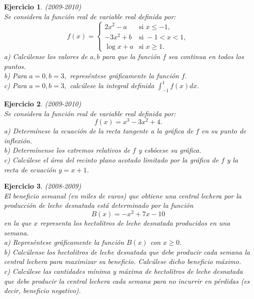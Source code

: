 \documentclass[12pt, a4paper]{amsart}
\newtheorem{ejer}{Ejercicio}
\begin{document}
\begin{ejer}\em (2009-2010)\\%
Se considera la función real de variable real definida por:
\begin{equation*}
f(x)=\left \{ \begin{matrix} 2x^2-a & \mbox{si } x\leq -1,
\\ -3x^2+b & \mbox{si } -1<x<1,
\\ \log x+a & \mbox{si } x\geq 1. \end{matrix}\right. 
\end{equation*}
a) Calcúlense los valores de $a,b$ para que la función $f$ sea continua en todos los puntos.\\
b) Para $a=0,b=3,$ represéntese gráficamente la función $f$.\\
c) Para $a=0,b=3,$ calcúlese la integral definida $\int_{-1}^1f(x)dx$.
\end{ejer}

\begin{ejer}\em (2009-2010)\\%
Se considera la función real de variable real definida por:
$$
f(x)=x^3-3x^2+4.
$$
a) Determínese la ecuación de la recta tangente a la gráfica de $f$ en su punto de inflexión.\\
b) Determínense los extremos relativos de $f$ y esbócese su gráfica.\\
c) Calcúlese el área del recinto plano acotado limitado por la gráfica de $f$ y la recta de ecuación $y=x+1$.
\end{ejer}

\begin{ejer}\em (2008-2009)\\%
El beneficio semanal (en miles de euros) que obtiene una central lechera por la producción de leche desnatada está determinado por la función
$$
B(x)=-x^2+7x-10
$$
en la que $x$ representa los hectolitros de leche desnatada producidos en una semana.\\
a) Represéntese gráficamente la función $B(x)$ con $x\geq 0$.\\
b) Calcúlense los hectolitros de leche desnatada que debe producir cada semana la central lechera para maximizar su beneficio. Calcúlese dicho beneficio máximo.\\
c) Calcúlese las cantidades mínima y máxima de hectolitros de leche desnatada que debe producir la central lechera cada semana para no incurrir en pérdidas (es decir, beneficio negativo).
\end{ejer}
\end{document}
